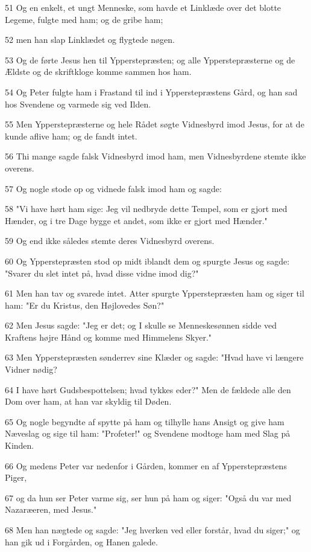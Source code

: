 \par 51 Og en enkelt, et ungt Menneske, som havde et Linklæde over det blotte Legeme, fulgte med ham; og de gribe ham;
\par 52 men han slap Linklædet og flygtede nøgen.
\par 53 Og de førte Jesus hen til Ypperstepræsten; og alle Ypperstepræsterne og de Ældste og de skriftkloge komme sammen hos ham.
\par 54 Og Peter fulgte ham i Frastand til ind i Ypperstepræstens Gård, og han sad hos Svendene og varmede sig ved Ilden.
\par 55 Men Ypperstepræsterne og hele Rådet søgte Vidnesbyrd imod Jesus, for at de kunde aflive ham; og de fandt intet.
\par 56 Thi mange sagde falsk Vidnesbyrd imod ham, men Vidnesbyrdene stemte ikke overens.
\par 57 Og nogle stode op og vidnede falsk imod ham og sagde:
\par 58 "Vi have hørt ham sige: Jeg vil nedbryde dette Tempel, som er gjort med Hænder, og i tre Dage bygge et andet, som ikke er gjort med Hænder."
\par 59 Og end ikke således stemte deres Vidnesbyrd overens.
\par 60 Og Ypperstepræsten stod op midt iblandt dem og spurgte Jesus og sagde: "Svarer du slet intet på, hvad disse vidne imod dig?"
\par 61 Men han tav og svarede intet. Atter spurgte Ypperstepræsten ham og siger til ham: "Er du Kristus, den Højlovedes Søn?"
\par 62 Men Jesus sagde: "Jeg er det; og I skulle se Menneskesønnen sidde ved Kraftens højre Hånd og komme med Himmelens Skyer."
\par 63 Men Ypperstepræsten sønderrev sine Klæder og sagde: "Hvad have vi længere Vidner nødig?
\par 64 I have hørt Gudsbespottelsen; hvad tykkes eder?" Men de fældede alle den Dom over ham, at han var skyldig til Døden.
\par 65 Og nogle begyndte af spytte på ham og tilhylle hans Ansigt og give ham Næveslag og sige til ham: "Profeter!" og Svendene modtoge ham med Slag på Kinden.
\par 66 Og medens Peter var nedenfor i Gården, kommer en af Ypperstepræstens Piger,
\par 67 og da hun ser Peter varme sig, ser hun på ham og siger: "Også du var med Nazaræeren, med Jesus."
\par 68 Men han nægtede og sagde: "Jeg hverken ved eller forstår, hvad du siger;" og han gik ud i Forgården, og Hanen galede.
